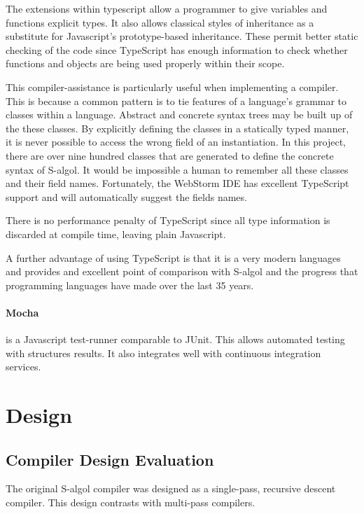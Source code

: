 \documentclass{article}
\begin{document}
The extensions within typescript allow a programmer to give variables and functions explicit types. It also allows classical styles of inheritance as a substitute for Javascript's prototype-based inheritance. These permit better static checking of the code since TypeScript has enough information to check whether functions and objects are being used properly within their scope.

This compiler-assistance is particularly useful when implementing a compiler. This is because a common pattern is to tie features of a language's grammar to classes within a language. Abstract and concrete syntax trees may be built up of the these classes. By explicitly defining the classes in a statically typed manner, it is never possible to access the wrong field of an instantiation. In this project, there are over nine hundred classes that are generated to define the concrete syntax of S-algol. It would be impossible a human to remember all these classes and their field names. Fortunately, the WebStorm IDE has excellent TypeScript support and will automatically suggest the fields names.

There is no performance penalty of TypeScript since all type information is discarded at compile time, leaving plain Javascript.

A further advantage of using TypeScript is that it is a very modern languages and provides and excellent point of comparison with S-algol and the progress that programming languages have made over the last 35 years. 
\paragraph{Mocha} is a Javascript test-runner comparable to JUnit. This allows automated testing with structures results. It also integrates well with continuous integration services.

\section{Design}


\subsection{Compiler Design Evaluation}

The original S-algol compiler was designed as a single-pass, recursive descent compiler. This design contrasts with multi-pass compilers.
\end{document}
